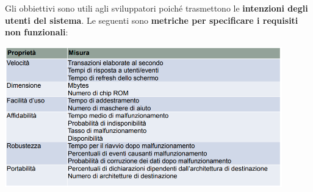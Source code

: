 \documentclass[12pt]{article}
\begin{document}
Gli obbiettivi sono utili agli sviluppatori poiché trasmettono le \textbf{intenzioni degli utenti del sistema}.
Le seguenti sono \textbf{metriche per specificare i requisiti non funzionali}:
\begin{center}
    \includegraphics[width = 0.90\textwidth]{Images/29.PNG}
\end{center}
\end{document}

